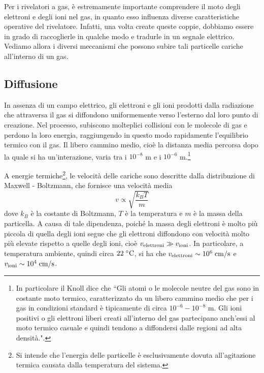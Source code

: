Per i rivelatori a gas, è estremamente importante comprendere il moto degli elettroni e degli ioni nel gas, in quanto esso influenza diverse caratteristiche operative del rivelatore. Infatti, una volta create queste coppie, dobbiamo essere in grado di raccoglierle in qualche modo e tradurle in un segnale elettrico. Vediamo allora i diversi meccanismi che possono subire tali particelle cariche all'interno di un gas.

\subsection{Diffusione}

In assenza di un campo elettrico, gli elettroni e gli ioni prodotti dalla radiazione che attraversa il gas si diffondono uniformemente verso l'esterno dal loro punto di creazione. Nel processo, subiscono molteplici collisioni con le molecole di gas e perdono la loro energia, raggiungendo in questo modo rapidamente l'equilibrio termico con il gas. Il libero cammino medio, cioè la distanza media percorsa dopo la quale si ha un'interazione, varia tra i $10^{-8}$ m e i $10^{-6}$ m.\footnote{In particolare il Knoll dice che ``Gli atomi o le molecole neutre del gas sono in costante moto termico, caratterizzato da un libero cammino medio che per i gas in condizioni standard è tipicamente di circa $10^{-6} - 10^{-8}$ m. Gli ioni positivi o gli elettroni liberi creati all'interno del gas partecipano anch'essi al moto termico casuale e quindi tendono a diffondersi dalle regioni ad alta densità.".}

A energie termiche\footnote{Si intende che l'energia delle particelle è esclusivamente dovuta all'agitazione termica causata dalla temperatura del sistema.}, le velocità delle cariche sono descritte dalla distribuzione di Maxwell - Boltzmann, che fornisce una velocità media 
\begin{equation*}
   v \propto \sqrt{\frac{k_B T}{m}}
\end{equation*}
dove $k_B$ è la costante di Boltzmann, $T$ è la temperatura e $m$ è la massa della particella. A causa di tale dipendenza, poiché la massa degli elettroni è molto più piccola di quella degli ioni segue che gli elettroni diffondono con velocità molto più elevate rispetto a quelle degli ioni, cioè $v_{\rm elettroni} \gg v_{\rm ioni}$. In particolare, a temperatura ambiente, quindi circa $22 \rm \; ^{\circ}C$, si ha che $v_{\rm elettroni} \sim 10^6 \; \rm cm/s$ e $v_{\rm ioni} \sim 10^4 \; \rm cm/s$.

